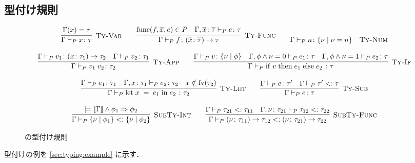 \subsection{型付け規則}
\label{sec:type-system}

\begin{figure}[H]
  \begin{align*}\begin{array}{c}
    \infer[\TyRuleVar] {
      \TyJudge{P}{\Gamma}{x}{\tau}
    } {
      \Gamma\paren{x} = \tau
    } \quad\quad
    \infer[\TyRuleFunc] {
      \TyJudge{P}{\Gamma}{f}{\TyFunc{\seq{x}}{\seq{\tau}}{\tau}}
    } {
      \Func{f}{\seq{x}}{e} \in P
      \quad \TyJudge{P}{\Gamma, \typed{\seq{x}}{\seq{\tau}}}{e}{\tau}
    } \quad\quad
    \TyJudge{P}{\Gamma}{n}{\TyInt{\nu}{\nu = n}} \quad \text{\TyRuleNum} \\\\
    \infer[\TyRuleApp] {
      \TyJudge{P}{\Gamma}{\App{v_1}{v_2}}{\tau_2}
    } {
      \TyJudge{P}{\Gamma}{v_1}{\TyFunc{x}{\tau_1}{\tau_2}}
      \quad \TyJudge{P}{\Gamma}{v_2}{\tau_1}
    } \quad\quad
    \infer[\TyRuleIf] {
      \TyJudge{P}{\Gamma}{\If{\; v \;}{\; e_1 \;}{\; e_2 \;}}{\tau}
    } {
      \TyJudge{P}{\Gamma}{v}{\TyInt{\nu}{\phi}}
      \quad \TyJudge{P}{\Gamma, \FormulaAnd{\phi}{\TermEq{\nu}{0}}}{e_1}{\tau}
      \quad \TyJudge{P}{\Gamma, \FormulaAnd{\phi}{\TermEq{\nu}{1}}}{e_2}{\tau}
    } \\\\
    \infer[\TyRuleLet] {
      \TyJudge{P}{\Gamma}{\Let{\; x \;}{\; e_1 \;}{\; e_2 \;}}{\tau_2}
    } {
      \TyJudge{P}{\Gamma}{e_1}{\tau_1}
      \quad \TyJudge{P}{\Gamma, \typed{x}{\tau_1}}{e_2}{\tau_2}
      \quad x \notin \fv{\tau_2}
    } \quad\quad
    \infer[\TyRuleSub] {
      \TyJudge{P}{\Gamma}{e}{\tau}
    } {
      \TyJudge{P}{\Gamma}{e}{\tau'}
      \quad \SubTyJudge{P}{\Gamma}{\tau'}{\tau}
    } \\\\
    \infer[\SubTyRuleInt] {
      \SubTyJudge{P}{\Gamma}{\TyInt{\nu}{\phi_1}}{\TyInt{\nu}{\phi_2}}
    } {
      \models \FormulaAnd{\sem{\Gamma}}{\phi_1} \Rightarrow \phi_2
    } \quad\quad
    \infer[\SubTyRuleFunc] {
      \SubTyJudge{P}{\Gamma}{\TyFunc{\nu}{\tau_{11}}{\tau_{12}}}{\TyFunc{\nu}{\tau_{21}}{\tau_{22}}}
    } {
      \SubTyJudge{P}{\Gamma}{\tau_{21}}{\tau_{11}}
      \quad \SubTyJudge{P}{\Gamma, \typed{\nu}{\tau_{21}}}{\tau_{12}}{\tau_{22}}
    }
  \end{array}\end{align*}
  \caption{\Yil の型付け規則}
  \label{fig:typing-rules}
\end{figure}

\par 型付けの例を \ref{sec:typing:example} に示す．
